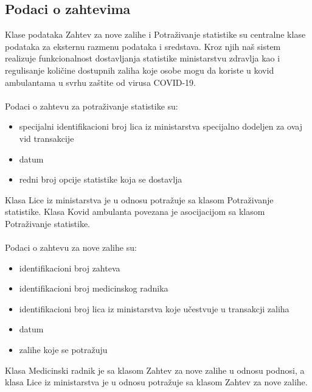 \documentclass[titlepage]{article}
\begin{document}
\subsection{Podaci o zahtevima}

Klase podataka Zahtev za nove zalihe i Potra\v{z}ivanje statistike su centralne klase podataka za eksternu razmenu podataka i sredstava. Kroz njih na\v{s} sistem realizuje funkcionalnost dostavljanja statistike ministarstvu zdravlja kao i regulisanje koli\v{c}ine dostupnih zaliha koje osobe mogu da koriste u kovid ambulantama  u svrhu za\v{s}tite od virusa COVID-19.
\\~\\
\noindent Podaci o zahtevu za potra\v{z}ivanje statistike su:

\begin{itemize}
    \item specijalni identifikacioni broj lica iz ministarstva specijalno dodeljen za ovaj vid transakcije
    \item datum
    \item redni broj opcije statistike koja se dostavlja
\end{itemize}

Klasa Lice iz ministarstva je u odnosu potra\v{z}uje sa klasom  Potra\v{z}ivanje statistike. Klasa Kovid ambulanta  povezana je asocijacijom sa klasom  Potra\v{z}ivanje statistike.
\\~\\
\noindent Podaci o zahtevu za nove zalihe su:

\begin{itemize}
    \item identifikacioni broj zahteva
    \item identifikacioni broj medicinskog radnika
    \item identifikacioni broj lica iz ministarstva koje u\v{c}estvuje u transakcji zaliha
   \item datum
   \item  zalihe koje se potra\v{z}uju	
\end{itemize}

Klasa Medicinski radnik je sa klasom Zahtev za nove zalihe u odnosu podnosi, a klasa Lice iz ministarstva je u odnosu potra\v{z}uje  sa klasom Zahtev za nove zalihe. 
\end{document}
